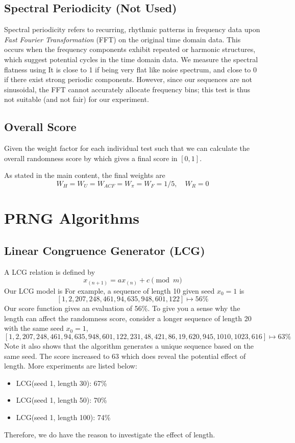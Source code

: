 \documentclass{report}
\begin{document}
\section{Spectral Periodicity (Not Used)}
Spectral periodicity refers to recurring, rhythmic patterns in frequency data upon \textit{Fast Fourier Transformation} (FFT) on the original time domain data. This occurs when the frequency components exhibit repeated or harmonic structures, which suggest potential cycles in the time domain data. We measure the spectral flatness using
It is close to 1 if being very flat like noise spectrum, and close to 0 if there exist strong periodic components. However, since our sequences are not sinusoidal, the FFT cannot accurately allocate frequency bins; this test is thus not suitable (and not fair) for our experiment.

\section{Overall Score}
Given the weight factor for each individual test such that
we can calculate the overall randomness score by
which gives a final score in $[0,1]$.

As stated in the main content, the final weights are
\[W_H=W_U=W_{ACF}=W_{\pi}=W_F=1/5,\quad W_R=0\]

\chapter{PRNG Algorithms}\label{app:Algo}
\section{Linear Congruence Generator (LCG)}
A LCG relation is defined by
\[x_{(n+1)}=ax_{(n)}+c \pmod{m}\]
Our LCG model is
For example, a sequence of length 10 given seed $x_0=1$ is
\[[1,2,207,248,461,94,635,948,601,122] \mapsto 56\%\]
Our score function gives an evaluation of 56\%. To give you a sense why the length can affect the randomness score, consider a longer sequence of length 20 with the same seed $x_0=1$,
\[[1,2,207,248,461,94,635,948,601,122,231,48,421,86,19,620,945,1010,1023,616] \mapsto 63\%\]
Note it also shows that the algorithm generates a unique sequence based on the same seed. The score increased to 63 which does reveal the potential effect of length. More experiments are listed below:
\begin{itemize}
    \item LCG(seed 1, length 30): 67\%
    \item LCG(seed 1, length 50): 70\%
    \item LCG(seed 1, length 100): 74\%
\end{itemize}
Therefore, we do have the reason to investigate the effect of length.
\end{document}
